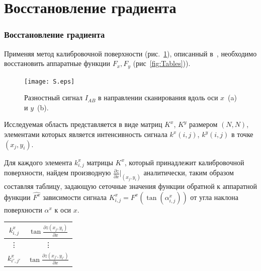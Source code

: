 \documentclass{beamer}
\begin{document}

\section{Восстановление градиента}
\begin{frame}
    \sectionpage
\end{frame}


\begin{frame}[c,allowframebreaks]
    \frametitle{Восстановление градиента}

    Применяя метод калибровочной поверхности (рис.~\ref{fig:inputSphere}), описанный в~\cite{main},
необходимо восстановить аппаратные функции $F_x, F_y$ (рис~\ref{fig:Tables})).

    \begin{figure}[hp]
        \texttt{[image: S.eps]}
        \caption{\small Разностный сигнал $I_{AB}$ в направлении сканирования вдоль
        оси $x$~(a) и $y$~(b).}
        {\label{fig:inputSphere}}%
    \end{figure}

    \framebreak

    Исследуемая область представляется в виде матриц $K^x$, $K^y$ размером $(N,N)$,
элементами которых является интенсивность сигнала $k^x (i,j)$, $k^y (i,j)$ в точке $(x_j, y_i)$.

    Для каждого элемента $k^x_{i,j}$ матрицы $K^x$, который принадлежит калибровочной поверхности,
найдем производную $\frac{\partial z}{\partial x} \big|_{(x_j,y_i)} $ аналитически, таким
образом составляя таблицу, задающую сеточные значения функции обратной к аппаратной функции
$\hat{F^x}$ зависимости сигнала $K^x_{i,j} = F^x (\tan(\alpha^x_{i,j}))$ от угла наклона
поверхности $\alpha^x$ к оси $x$.
    \begin{center}
        \begin{tabular}{| c| c |}
            \hline
            $ k^x_{i,j} $ & $ \tan{ \frac{\partial z(x_j, y_i)}{\partial x} } $ \\
            \hline
            \vdots          & \vdots \\
            \hline
            $ k^x_{i',j'} $ & $ \tan{ \frac{\partial z(x_{j'}, y_{i'})}{\partial x} } $ \\
            \hline
        \end{tabular}
    \end{center}


\end{frame}
\end{document}
